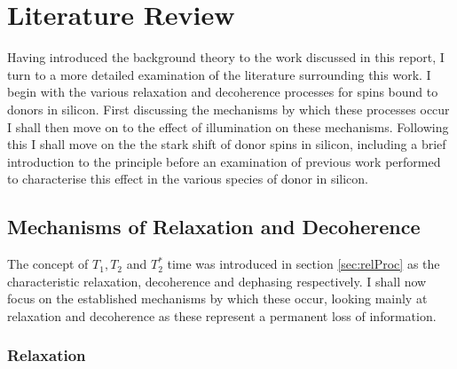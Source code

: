 
\chapter{Literature Review}
\label{chap:litRev}

Having introduced the background theory to the work discussed in this report, I turn to a more detailed examination of the literature surrounding this work.
I begin with the various relaxation and decoherence processes for spins bound to donors in silicon.
First discussing the mechanisms by which these processes occur I shall then move on to the effect of illumination on these mechanisms.
Following this I shall move on the the stark shift of donor spins in silicon, including a brief introduction to the principle before an examination of previous work performed to characterise this effect in the various species of donor in silicon.


\section{Mechanisms of Relaxation and Decoherence}

The concept of $T_1, T_2$ and $T_2^*$ time was introduced in section \ref{sec:relProc} as the characteristic relaxation, decoherence and dephasing respectively. 
I shall now focus on the established mechanisms by which these occur, looking mainly at relaxation and decoherence as these represent a permanent loss of information.

\subsection{Relaxation}

